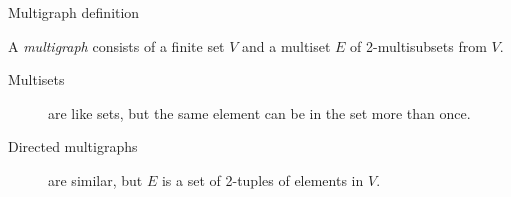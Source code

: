 \documentclass{beamer}
\begin{document}
  
  
  \begin{frame}{Multigraph definition}
    \begin{definition}
    A \emph{multigraph} consists of a finite set $V$ and a multiset $E$ of 2-multisubsets from $V$.
    \end{definition}
    \vspace{0.2cm}
    \begin{description}
      \item[Multisets] are like sets, but the same element can be in the set more than once.
      \item[Directed multigraphs] are similar, but $E$ is a set of 2-tuples of elements in $V$.
    \end{description}
  \end{frame}
  
\end{document}
